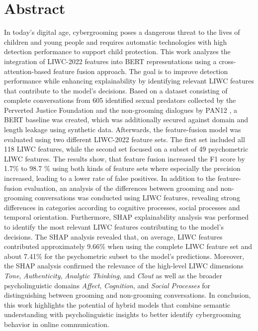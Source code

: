 \chapter{Abstract}

In today's digital age, cybergrooming poses a dangerous threat to the lives of children and young people and requires automatic technologies with high detection performance to support child protection. This work analyzes the integration of LIWC-2022 features \cite{pennebaker2022liwc} into BERT representations \cite{devlin2019bert} using a cross-attention-based feature fusion approach. The goal is to improve detection performance while enhancing explainability by identifying relevant LIWC features that contribute to the model's decisions. Based on a dataset consisting of complete conversations from 605 identified sexual predators collected by the Perverted Justice Foundation \cite{pj} and the non-grooming dialogues by PAN12 \cite{inches2012pan}, a BERT baseline was created, which was additionally secured against domain and length leakage using synthetic data. Afterwards, the feature-fusion model was evaluated using two different LIWC-2022 feature sets. The first set included all 118 LIWC features, while the second set focused on a subset of 49 psychometric LIWC features. The results show, that feature fusion increased the F1 score by 1.7\% to 98.7 \% using both kinds of feature sets where especially the precision increased, leading to a lower rate of false positives. In addition to the feature-fusion evaluation, an analysis of the differences between grooming and non-grooming conversations was conducted using LIWC features, revealing strong differences in categories according to cognitive processes, social processes and temporal orientation. Furthermore, SHAP \cite{lundberg2017shap} explainability analysis was performed to identify the most relevant LIWC features contributing to the model's decisions. The SHAP analysis revealed that, on average, LIWC features contributed approximately 9.66\% when using the complete LIWC feature set and about 7.41\% for the psychometric subset to the model’s predictions. Moreover, the SHAP analysis confirmed the relevance of the high-level LIWC dimensions \textit{Tone}, \textit{Authenticity}, \textit{Analytic Thinking}, and \textit{Clout} as well as the broader psycholinguistic domains \textit{Affect}, \textit{Cognition}, and \textit{Social Processes} for distinguishing between grooming and non-grooming conversations. In conclusion, this work highlights the potential of hybrid models that combine semantic understanding with psycholinguistic insights to better identify cybergrooming behavior in online communication.


